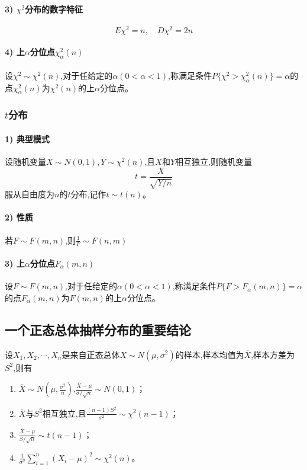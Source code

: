 \documentclass[UTF8]{ctexart}
\theoremstyle{remark}
\begin{document}
		\paragraph{3) \(\chi^{2}\)分布的数字特征}
		\[
		E\chi^{2}=n, \quad D\chi^{2}=2n
		\]
		
		\paragraph{4) 上\(\alpha\)分位点\(\chi_{\alpha}^{2}(n)\)}
		设\(\chi^{2}\sim\chi^{2}(n)\),对于任给定的\(\alpha(0 < \alpha < 1)\),称满足条件\(P\{\chi^{2}>\chi_{\alpha}^{2}(n)\}=\alpha\)的点\(\chi_{\alpha}^{2}(n)\)为\(\chi^{2}(n)\)的上\(\alpha\)分位点。
		
		\subsubsection{\(t\)分布}
		\paragraph{1) 典型模式}
		设随机变量\(X\sim N(0,1), Y\sim\chi^{2}(n)\),且\(X\)和\(Y\)相互独立,则随机变量
		\[
		t = \frac{X}{\sqrt{Y/n}}
		\]
		服从自由度为\(n\)的\(t\)分布,记作\(t\sim t(n)\)。
		
		\paragraph{2) 性质}
		若$F\sim F(m,n)$,则$\frac{1}{F}\sim F(n,m)$
		
		\paragraph{3) 上\(\alpha\)分位点\(F_{\alpha}(m,n)\)}
		设\(F\sim F(m,n)\),对于任给定的\(\alpha(0 < \alpha < 1)\),称满足条件\(P\{F > F_{\alpha}(m,n)\}=\alpha\)的点\(F_{\alpha}(m,n)\)为\(F(m,n)\)的上\(\alpha\)分位点。
		
		\subsection{一个正态总体抽样分布的重要结论}
		设\(X_1, X_2, \cdots, X_n\)是来自正态总体\(X\sim N(\mu,\sigma^{2})\)的样本,样本均值为\(\overline{X}\),样本方差为\(S^{2}\),则有
		\begin{enumerate}
			\item \(\overline{X}\sim N(\mu,\frac{\sigma^{2}}{n})\),\(\frac{\overline{X}-\mu}{\sigma/\sqrt{n}}\sim N(0,1)\)；
			\item \(\overline{X}\)与\(S^{2}\)相互独立,且\(\frac{(n - 1)S^{2}}{\sigma^{2}}\sim\chi^{2}(n - 1)\)；
			\item \(\frac{\overline{X}-\mu}{S/\sqrt{n}}\sim t(n - 1)\)；
			\item \(\frac{1}{\sigma^{2}}\sum_{i = 1}^{n}(X_i - \mu)^{2}\sim\chi^{2}(n)\)。
		\end{enumerate}
		
\end{document}
